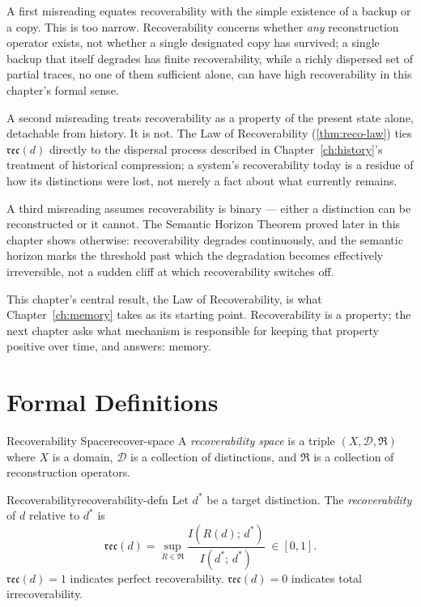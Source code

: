 \documentclass[12pt,twoside,openright]{book}
\newcommand{\reco}{\mathfrak{rec}}
\begin{document}
A first misreading equates recoverability with the simple
existence of a backup or a copy. This is too narrow.
Recoverability concerns whether \emph{any} reconstruction
operator exists, not whether a single designated copy has
survived; a single backup that itself degrades has finite
recoverability, while a richly dispersed set of partial
traces, no one of them sufficient alone, can have high
recoverability in this chapter's formal sense.

A second misreading treats recoverability as a property of
the present state alone, detachable from history. It is not.
The Law of Recoverability (\cref{thm:reco-law}) ties
$\reco(d)$ directly to the dispersal process described in
Chapter~\ref{ch:history}'s treatment of historical
compression; a system's recoverability today is a residue of
how its distinctions were lost, not merely a fact about what
currently remains.

A third misreading assumes recoverability is binary ---
either a distinction can be reconstructed or it cannot. The
Semantic Horizon Theorem proved later in this chapter shows
otherwise: recoverability degrades continuously, and the
semantic horizon marks the threshold past which the
degradation becomes effectively irreversible, not a sudden
cliff at which recoverability switches off.

This chapter's central result, the Law of Recoverability, is
what Chapter~\ref{ch:memory} takes as its starting point.
Recoverability is a property; the next chapter asks what
mechanism is responsible for keeping that property positive
over time, and answers: memory.

\section{Formal Definitions}
\label{sec:ch5-formal}

\begin{definition}{Recoverability Space}{recover-space}
  A \emph{recoverability space} is a triple
  $(X, \mathcal{D}, \mathfrak{R})$ where $X$ is a domain,
  $\mathcal{D}$ is a collection of distinctions, and
  $\mathfrak{R}$ is a collection of reconstruction
  operators.
\end{definition}

\begin{definition}{Recoverability}{recoverability-defn}
  Let $d^*$ be a target distinction. The
  \emph{recoverability} of $d$ relative to $d^*$ is
  \[
    \reco(d)
    = \sup_{R \in \mathfrak{R}}
      \frac{I(R(d);\, d^*)}{I(d^*;\, d^*)}
    \;\in [0, 1].
  \]
  $\reco(d) = 1$ indicates perfect recoverability.
  $\reco(d) = 0$ indicates total irrecoverability.
\end{definition}
\end{document}
